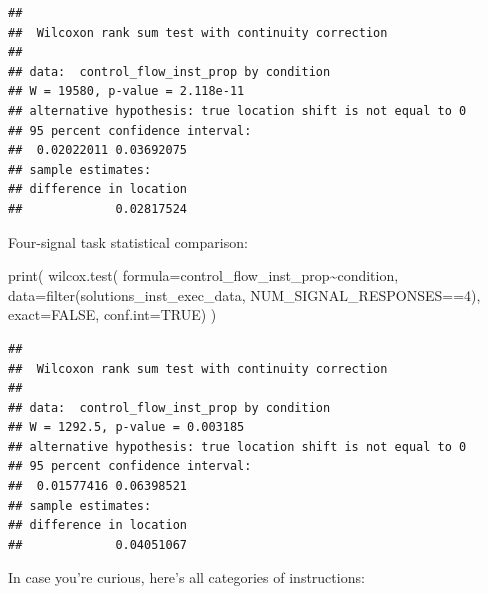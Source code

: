 \documentclass[
]{book}
\newenvironment{Shaded}{\begin{snugshade}}{\end{snugshade}}
\newcommand{\AttributeTok}[1]{\textcolor[rgb]{0.77,0.63,0.00}{#1}}
\newcommand{\ConstantTok}[1]{\textcolor[rgb]{0.00,0.00,0.00}{#1}}
\newcommand{\DecValTok}[1]{\textcolor[rgb]{0.00,0.00,0.81}{#1}}
\newcommand{\FunctionTok}[1]{\textcolor[rgb]{0.00,0.00,0.00}{#1}}
\newcommand{\NormalTok}[1]{#1}
\newcommand{\SpecialCharTok}[1]{\textcolor[rgb]{0.00,0.00,0.00}{#1}}
\begin{document}
\begin{verbatim}
## 
##  Wilcoxon rank sum test with continuity correction
## 
## data:  control_flow_inst_prop by condition
## W = 19580, p-value = 2.118e-11
## alternative hypothesis: true location shift is not equal to 0
## 95 percent confidence interval:
##  0.02022011 0.03692075
## sample estimates:
## difference in location 
##             0.02817524
\end{verbatim}

Four-signal task statistical comparison:

\begin{Shaded}
\begin{Highlighting}[]
\FunctionTok{print}\NormalTok{(}
  \FunctionTok{wilcox.test}\NormalTok{(}
    \AttributeTok{formula=}\NormalTok{control\_flow\_inst\_prop}\SpecialCharTok{\textasciitilde{}}\NormalTok{condition,}
    \AttributeTok{data=}\FunctionTok{filter}\NormalTok{(solutions\_inst\_exec\_data, NUM\_SIGNAL\_RESPONSES}\SpecialCharTok{==}\DecValTok{4}\NormalTok{),}
    \AttributeTok{exact=}\ConstantTok{FALSE}\NormalTok{,}
    \AttributeTok{conf.int=}\ConstantTok{TRUE}\NormalTok{)}
\NormalTok{)}
\end{Highlighting}
\end{Shaded}

\begin{verbatim}
## 
##  Wilcoxon rank sum test with continuity correction
## 
## data:  control_flow_inst_prop by condition
## W = 1292.5, p-value = 0.003185
## alternative hypothesis: true location shift is not equal to 0
## 95 percent confidence interval:
##  0.01577416 0.06398521
## sample estimates:
## difference in location 
##             0.04051067
\end{verbatim}

In case you're curious, here's all categories of instructions:
\end{document}

